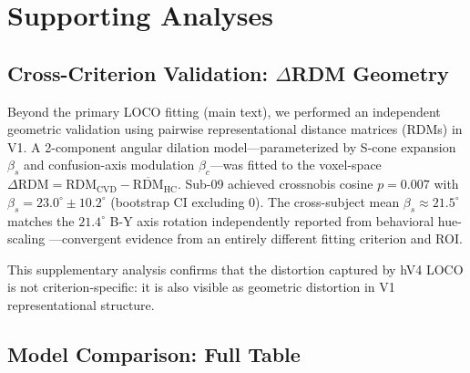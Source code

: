 \documentclass{article}
\begin{document}



\newpage
\appendix
\onecolumn

\section{Supporting Analyses}
\label{app:supporting}

\subsection{Cross-Criterion Validation: $\Delta$RDM Geometry}

Beyond the primary LOCO fitting (main text), we performed an independent geometric validation using pairwise representational distance matrices (RDMs) in V1.
A 2-component angular dilation model---parameterized by S-cone expansion $\beta_s$ and confusion-axis modulation $\beta_c$---was fitted to the voxel-space $\Delta\text{RDM} = \text{RDM}_{\text{CVD}} - \overline{\text{RDM}}_{\text{HC}}$.
Sub-09 achieved crossnobis cosine $p = 0.007$ with $\beta_s = 23.0^\circ \pm 10.2^\circ$ (bootstrap CI excluding 0).
The cross-subject mean $\beta_s \approx 21.5^\circ$ matches the $21.4^\circ$ B-Y axis rotation independently reported from behavioral hue-scaling \cite{placeholder_emery2021}---convergent evidence from an entirely different fitting criterion and ROI.

This supplementary analysis confirms that the distortion captured by hV4 LOCO is not criterion-specific: it is also visible as geometric distortion in V1 representational structure.

\subsection{Model Comparison: Full Table}
\end{document}
